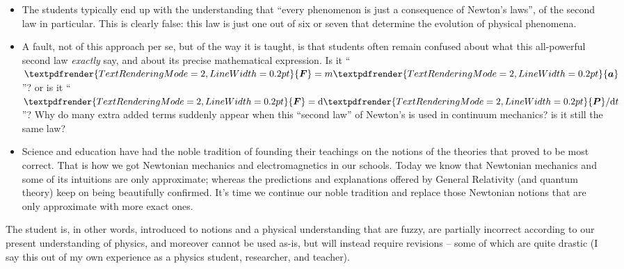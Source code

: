 \documentclass[a4paper,12pt,%
onecolumn,oneside,%
british%
]{memoir}
\renewcommand*{\bm}[1]{\textpdfrender{TextRenderingMode=2,LineWidth=0.2pt}{\boldsymbol{#1}}}
\newcommand*{\di}{\mathrm{d}}%
\renewcommand*{\|}[1][]{\nonscript\:#1\vert\nonscript\:\mathopen{}}
\newcommand*{\dt}{\di t}
\begin{document}
\begin{itemize}
\item The students typically end up with the understanding that \enquote{every phenomenon is just a consequence of Newton's laws}, of the second law in particular. This is clearly false: this law is just one out of six or seven that determine the evolution of physical phenomena.

\item A fault, not of this approach per se, but of the way it is taught, is that students often remain confused about what this all-powerful second law \emph{exactly} say, and about its precise mathematical expression. Is it \enquote{$\bm{F}=m\bm{a}$}? or is it \enquote{$\bm{F}=\di\bm{P}/\dt$}? Why do many extra added terms suddenly appear when this \enquote{second law} of Newton's is used in continuum mechanics? is it still the same law?

\item Science and education have had the noble tradition of founding their teachings on the notions of the theories that proved to be most correct. That is how we got Newtonian mechanics and electromagnetics in our schools. Today we know that Newtonian mechanics and some of its intuitions are only approximate; whereas the predictions and explanations offered by General Relativity (and quantum theory) keep on being beautifully confirmed. It's time we continue our noble tradition and replace those Newtonian notions that are only approximate with more exact ones.

\end{itemize}

  The student is, in other words, introduced to notions and a physical understanding that are fuzzy, are partially incorrect according to our present understanding of physics, and moreover cannot be used as-is, but will instead require revisions -- some of which are quite drastic (I say this out of my own experience as a physics student, researcher, and teacher).
\end{document}
